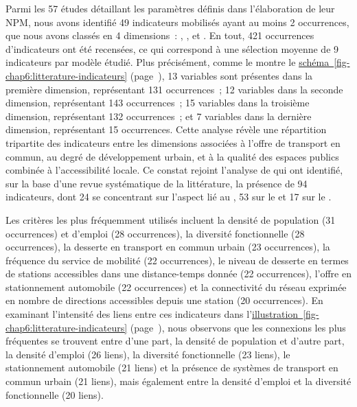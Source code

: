 \begin{refsegment}
Parmi les 57 études détaillant les paramètres définis dans l'élaboration de leur \acrshort{NPM}, nous avons identifié 49 indicateurs mobilisés ayant au moins 2 occurrences, que nous avons classés en 4 dimensions~: , ,  et . En tout, 421 occurrences d’indicateurs ont été recensées, ce qui correspond à une sélection moyenne de 9 indicateurs par modèle étudié. Plus précisément, comme le montre le \hyperref[fig-chap6:litterature-indicateurs]{schéma~\ref{fig-chap6:litterature-indicateurs}} (page~\pageref{fig-chap6:litterature-indicateurs}), 13 variables sont présentes dans la première dimension, représentant 131 occurrences~; 12 variables dans la seconde dimension, représentant 143 occurrences~; 15 variables dans la troisième dimension, représentant 132 occurrences~; et 7 variables dans la dernière dimension, représentant 15 occurrences. Cette analyse révèle une répartition tripartite des indicateurs entre les dimensions associées à l'offre de transport en commun, au degré de développement urbain, et à la qualité des espaces publics combinée à l'accessibilité locale. Ce constat rejoint l'analyse de \textcolor{blue}{\textcite[42]{lyu_developing_2016}} qui ont identifié, sur la base d'une revue systématique de la littérature, la présence de 94 indicateurs, dont 24 se concentrant sur l'aspect lié au , 53 sur le  et 17 sur le .%

Les critères les plus fréquemment utilisés incluent la densité de population (31 occurrences) et d'emploi (28 occurrences), la diversité fonctionnelle (28 occurrences), la desserte en transport en commun urbain (23 occurrences), la fréquence du service de mobilité (22 occurrences), le niveau de desserte en termes de stations accessibles dans une distance-temps donnée (22 occurrences), l'offre en stationnement automobile (22 occurrences) et la connectivité du réseau exprimée en nombre de directions accessibles depuis une station (20 occurrences). En examinant l'intensité des liens entre ces indicateurs dans l'\hyperref[fig-chap6:litterature-indicateurs]{illustration~\ref{fig-chap6:litterature-indicateurs}} (page~\pageref{fig-chap6:litterature-indicateurs}), nous observons que les connexions les plus fréquentes se trouvent entre d'une part, la densité de population et d'autre part, la densité d'emploi (26 liens), la diversité fonctionnelle (23 liens), le stationnement automobile (21 liens) et la présence de systèmes de transport en commun urbain (21 liens), mais également entre la densité d'emploi et la diversité fonctionnelle (20 liens).%


\end{refsegment}
